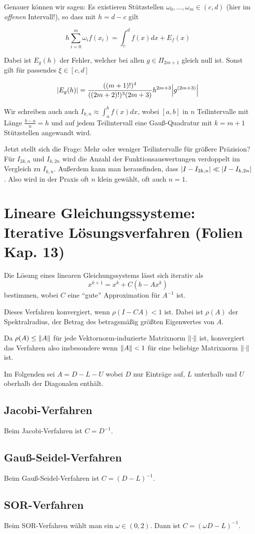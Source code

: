 \documentclass[a4paper,parskip=half*,DIV=7,fontsize=11pt]{scrartcl}
\DeclarePairedDelimiter\abs{\lvert}{\rvert}
\DeclarePairedDelimiter\norm{\lVert}{\rVert}
\begin{document}
Genauer können wir sagen: Es existieren Stützstellen $\omega_0, \ldots, \omega_m \in (c, d)$ (hier im \emph{offenen} Intervall!), so dass mit $h = d - c$ gilt

\[ 
  h \sum_{i=0}^m \omega_i f(x_i) = \int_c^d f(x) dx + E_f(x)
\]

Dabei ist $E_g(h)$ der Fehler, welcher bei allen $g \in \Pi_{2m+1}$ gleich null ist. Sonst gilt für passendes $\xi \in [c, d]$

\[
  \abs*{E_g(h)} = \frac{((m+1)!)^4}{((2m+2)!)^3 (2m+3)} h^{2m+3} \abs*{g^{(2m+3)}}
\]

Wir schreiben auch auch $I_{k,n} \approx \int_a^b f(x) dx$, wobei $[a, b]$ in $n$ Teilintervalle mit Länge $\frac{b-a}{n} = h$ und auf jedem Teilintervall eine Gauß-Quadratur mit $k = m + 1$ Stützstellen angewandt wird.

Jetzt stellt sich die Frage: Mehr oder weniger Teilintervalle für größere Präzision? Für $I_{2k,n}$ und $I_{k,2n}$ wird die Anzahl der Funktionsauswertungen verdoppelt im Vergleich zu $I_{k,n}$. Außerdem kann man herausfinden, dass $\abs{I - I_{2k,n}} \ll \abs{I - I_{k,2n}}$. Also wird in der Praxis oft $n$ klein gewählt, oft auch $n = 1$.

\section{Lineare Gleichungssysteme: Iterative Lösungsverfahren (Folien Kap. 13)}

Die Lösung eines linearen Gleichungssystems lässt sich iterativ als
\[x^{k+1} = x^k+ C(b-Ax^k)\]
bestimmen, wobei $C$ eine ``gute'' Approximation für $A^{-1}$ ist.

Dieses Verfahren konvergiert, wenn $\rho(I-CA) < 1$ ist. Dabei ist $\rho(A)$ der Spektralradius, der Betrag des betragsmäßig größten Eigenwertes von $A$.

Da $\rho(A) \le \norm{A}$ für jede Vektornorm-induzierte Matrixnorm $\norm{\cdot}$ ist, konvergiert das Verfahren also insbesondere wenn $\norm{A} < 1$ für eine beliebige Matrixnorm $\norm{\cdot}$ ist.

Im Folgenden sei $A = D-L-U$ wobei $D$ nur Einträge auf, $L$ unterhalb und $U$ oberhalb der Diagonalen enthält.

\subsection{Jacobi-Verfahren}

Beim Jacobi-Verfahren ist $C = D^{-1}$.

\subsection{Gauß-Seidel-Verfahren}

Beim Gauß-Seidel-Verfahren ist $C = (D-L)^{-1}$.

\subsection{SOR-Verfahren}

Beim SOR-Verfahren wählt man ein $\omega \in (0,2)$. Dann ist $C = (\omega D - L)^{-1}$.
\end{document}
